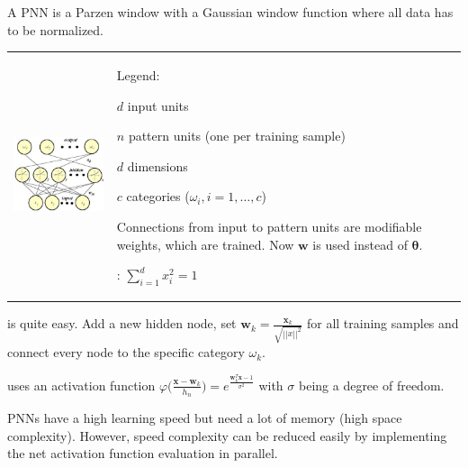   
  A PNN is a Parzen window with a Gaussian window function where all data has to be normalized.\\
    \begin{tabular}{ll}
      \parbox{7cm}{\includegraphics[width=5.5cm]{./images/probabilistic_neural_network.jpg}}
      & \parbox{11cm}{
      Legend:
      \begin{liste}
        \item $d$ input units
        \item $n$ pattern units (one per training sample)
        \item $d$ dimensions
        \item $c$ categories ($\omega_i, i=1,\ldots,c$)
        \item Connections from input to pattern units are modifiable weights, which are trained.
        Now $\bm{w}$ is used instead of $\bm{\theta}$.
        \item {}: $\sum\limits_{i=1}^d x_i^2 = 1$
      \end{liste}}
    \end{tabular}
    
     is quite easy. Add a new hidden node, set $\bm{w}_k = \frac{\bm{x}_k}{\sqrt{||x||^2}}$ for all training samples 
    and connect every node to the specific category $\omega_k$.
    
     uses an activation function 
    $\varphi\Big(\frac{\bm{x}-\bm{w}_k}{h_n}\Big) = e^{\frac{\bm{w}_k^T \bm{x}-1}{\sigma^2}}$ 
    with $\sigma$ being a degree of freedom.
    
    PNNs have a high learning speed but need a lot of memory (high space complexity). However,
    speed complexity can be reduced easily by implementing the net activation function evaluation in
    parallel.
    
